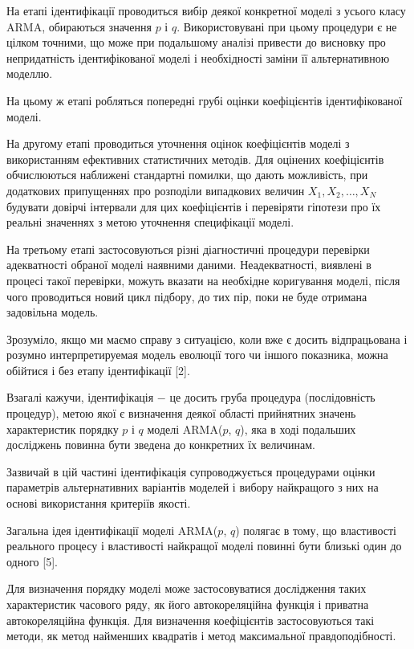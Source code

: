 На етапі ідентифікації проводиться вибір деякої конкретної моделі з усього класу ARMA, обираються значення $p$ і $q$. Використовувані при цьому процедури є не цілком точними, що може при подальшому аналізі привести до висновку про непридатність ідентифікованої моделі і необхідності заміни її альтернативною моделлю. 

На цьому ж етапі робляться попередні грубі оцінки коефіцієнтів ідентифікованої моделі.

На другому етапі проводиться уточнення оцінок коефіцієнтів моделі з використанням ефективних статистичних методів. Для оцінених коефіцієнтів обчислюються наближені стандартні помилки, що дають можливість, при додаткових припущеннях про розподіли випадкових величин $X_{1}, X_{2}, \dots, X_{N}$ будувати довірчі інтервали для цих коефіцієнтів і перевіряти гіпотези про їх реальні значеннях з метою уточнення специфікації моделі.

На третьому етапі застосовуються різні діагностичні процедури перевірки адекватності обраної моделі наявними даними. Неадекватності, виявлені в процесі такої перевірки, можуть вказати на необхідне коригування моделі, після чого проводиться новий цикл підбору, до тих пір, поки не буде отримана задовільна модель. 

Зрозуміло, якщо ми маємо справу з ситуацією, коли вже є досить відпрацьована і розумно интерпретируемая модель еволюції того чи іншого показника, можна обійтися і без етапу ідентифікації [2].

Взагалі кажучи, ідентифікація $-$ це досить груба процедура (послідовність процедур), метою якої є визначення деякої області прийнятних значень характеристик порядку $p$ і $q$ моделі ARMA($p$, $q$), яка в ході подальших досліджень повинна бути зведена до конкретних їх величинам.

Зазвичай в цій частині ідентифікація супроводжується процедурами оцінки параметрів альтернативних варіантів моделей і вибору найкращого з них на основі використання критеріїв якості.

Загальна ідея ідентифікації моделі ARMA($p$, $q$) полягає в тому, що властивості реального процесу і властивості найкращої моделі повинні бути близькі один до одного [5].

Для визначення порядку моделі може застосовуватися дослідження таких характеристик часового ряду, як його автокореляційна функція і приватна автокореляційна функція. Для визначення коефіцієнтів застосовуються такі методи, як метод найменших квадратів і метод максимальної правдоподібності.

